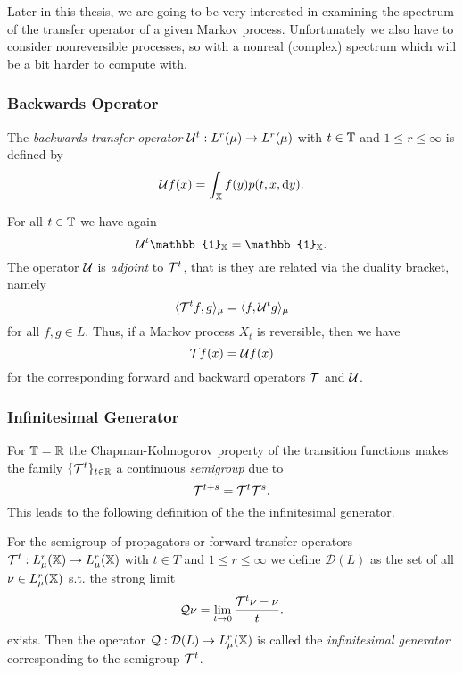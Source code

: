 Later in this thesis, we are going to be very interested in examining the spectrum of the transfer operator of a given Markov process. Unfortunately we also have to consider nonreversible processes, so with a nonreal (complex) spectrum which will be a bit harder to compute with.

\subsubsection*{Backwards Operator}

\begin{defi}
The \textit{backwards transfer operator} $\mathcal{U}^t: L^r(\mu) \rightarrow L^r(\mu)$ with $t \in \mathbb{T}$ and $1 \leq r  \leq \infty$ is defined by
\begin{equation}
\mathcal{U} f(x) = \int_{\mathbb{X}} f(y) p(t,x,\mathop{}\!\mathrm{d} y).
\end{equation}
\end{defi}
For all $t \in \mathbb{T}$ we have again
\begin{equation*}
\Ucal^t \mathbb{1}_\X = \mathbb{1}_\X.
\end{equation*}
The operator $\mathcal{U}$ is \textit{adjoint} to $\mathcal{T}^t$, that is they are related via the duality bracket, namely
\begin{equation*}
\langle \mathcal{T}^t f, g \rangle_\mu = \langle f, \mathcal{U}^t g \rangle_\mu
\end{equation*}
for all $f,g \in L$. 
Thus, if a Markov process $X_t$ is reversible, then we have
\begin{equation*}
\mathcal{T} f(x) = \mathcal{U} f(x)
\end{equation*}
for the corresponding forward and backward operators $\mathcal{T}$ and $\mathcal{U}$.

\subsubsection*{Infinitesimal Generator}

For $\mathbb{T} = \mathbb{R}$ the Chapman-Kolmogorov property of the transition functions makes the family $\{\mathcal{T}^t\}_{t\in\mathbb{R}}$ a continuous \textit{semigroup} due to 
\begin{equation*}
\mathcal{T}^{t+s} = \mathcal{T}^t \mathcal{T}^s.
\end{equation*}
This leads to the following definition of the the infinitesimal generator. 

\begin{defi}
For the semigroup of propagators or forward transfer operators $\mathcal{T}^t : L_\mu^r (\mathbb{X}) \rightarrow L_\mu^r (\mathbb{X})$ with $t \in T$ and $1\leq r \leq \infty$ we define $\mathcal{D}(L)$ as the set of all $\nu \in L_\mu^r(\mathbb{X})$ s.t. the strong limit
\begin{equation*}
\mathcal{Q} \nu = \lim_{t \rightarrow 0} \frac{\mathcal{T}^t\nu-\nu}{t}.
\end{equation*}
exists. Then the operator $\mathcal{Q}: \mathcal{D}(L) \rightarrow L_\mu^r(\mathbb{X})$ is called the \textit{infinitesimal generator} corresponding to the semigroup $\mathcal{T}^t$.
\end{defi}

